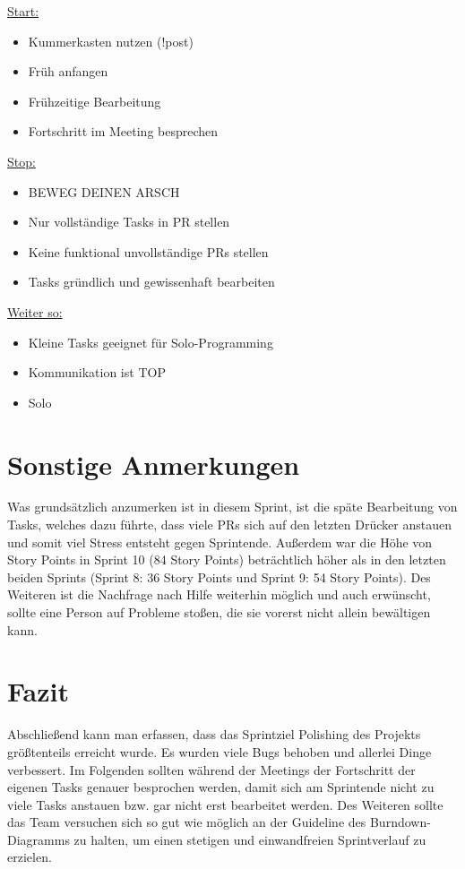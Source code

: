 \documentclass[12pt,a4paper, oneside]{article}
\begin{document}
    \underline{Start:}
    \begin{itemize}
        \item Kummerkasten nutzen (!post)
        \item Früh anfangen
        \item Frühzeitige Bearbeitung
        \item Fortschritt im Meeting besprechen
    \end{itemize}

    \underline{Stop:}
    \begin{itemize}
        \item BEWEG DEINEN ARSCH
        \item Nur vollständige Tasks in PR stellen
        \item Keine funktional unvollständige PRs stellen
        \item Tasks gründlich und gewissenhaft bearbeiten
    \end{itemize}

    \underline{Weiter so:}
    \begin{itemize}
        \item Kleine Tasks geeignet für Solo-Programming
        \item Kommunikation ist TOP
        \item Solo
    \end{itemize}

    \newpage


    \section{Sonstige Anmerkungen}
    Was grundsätzlich anzumerken ist in diesem Sprint, ist die späte Bearbeitung von Tasks, welches dazu führte, dass viele PRs sich auf den letzten Drücker anstauen und somit viel Stress entsteht gegen Sprintende.
    Außerdem war die Höhe von Story Points in Sprint 10 (84 Story Points) beträchtlich höher als in den letzten beiden Sprints (Sprint 8: 36 Story Points und Sprint 9: 54 Story Points).
    Des Weiteren ist die Nachfrage nach Hilfe weiterhin möglich und auch erwünscht, sollte eine Person auf Probleme stoßen, die sie vorerst nicht allein bewältigen kann.


    \section{Fazit}
    Abschließend kann man erfassen, dass das Sprintziel \glqq Polishing des Projekts \grqq{} größtenteils erreicht wurde. Es wurden viele Bugs behoben und allerlei Dinge verbessert. Im Folgenden sollten während der Meetings der Fortschritt der eigenen Tasks genauer besprochen werden, damit sich am Sprintende nicht zu viele Tasks anstauen bzw. gar nicht erst bearbeitet werden. Des Weiteren sollte das Team versuchen sich so gut wie möglich an der Guideline des Burndown-Diagramms zu halten, um einen stetigen und einwandfreien Sprintverlauf zu erzielen.
\end{document}
